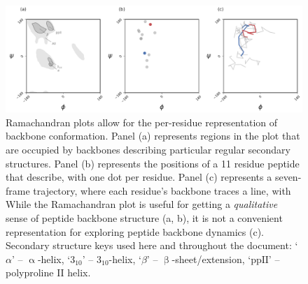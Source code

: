 \documentclass[fleqn,10pt,lineno]{wlpeerj} %
\newcommand{\n}[1]{{\color{red}#1}}
\begin{document}
\begin{figure}[t!]
\begin{adjustwidth}{-1in}{0in} %
\centering
\includegraphics[width=1.0\linewidth]{automated_figures/fig_rama_intro.pdf}
\caption{\n{Ramachandran plots allow for the per-residue representation of backbone conformation. Panel (a) represents regions in the plot that are occupied by backbones describing particular regular secondary structures. Panel (b) represents the positions of a 11 residue peptide that describe, with one dot per residue. Panel (c) represents a seven-frame trajectory, where each residue's backbone traces a line, with } While the Ramachandran plot is useful for getting a {\it qualitative} sense of peptide backbone structure (a, \n{b}), it is not a convenient representation for exploring peptide backbone dynamics (c). {\footnotesize Secondary structure keys used here and throughout the document: `$\alpha$' -- $\upalpha$-helix, `$3_{10}$' -- $3_{10}$-helix, `$\beta$' -- $\upbeta$-sheet/extension, `$\textrm{ppII}$' -- polyproline II helix.}\label{fig:ramaintro}} 
\end{adjustwidth}
\end{figure}
\end{document}
